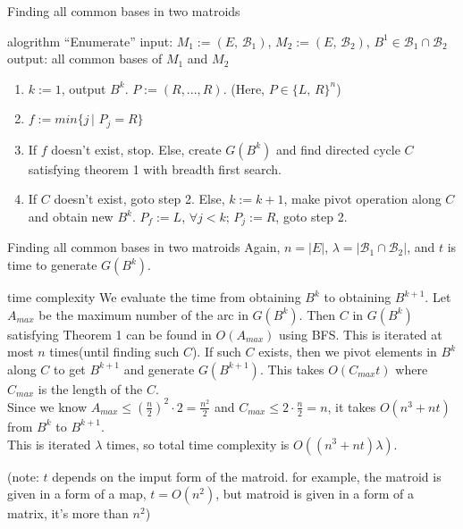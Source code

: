 \documentclass[11pt,xcolor=dvipsnames,table,dvipdfmx]{beamer}
\begin{document}
\begin{frame}{Finding all common bases in two matroids}
 \begin{block}{alogrithm ``Enumerate''}
  input: $M_1 := (E,\,\mathcal{B}_1)$, $M_2 := (E,\,\mathcal{B}_2)$, $B^1 \in \mathcal{B}_1 \cap \mathcal{B}_2$\\
  output: all common bases of $M_1$ and $M_2$\\
  \begin{enumerate}
   \item $k := 1$, output $B^k$. $P := (R, ..., R)$. (Here, $P \in \{L,\,R\}^n$)
   \item $f := min\{j\,|\,\,P_j = R\}$
   \item If $f$ doesn't exist, stop. Else, create $G(B^k)$ and find directed cycle $C$ satisfying theorem 1 with breadth first search.
   \item If $C$ doesn't exist, goto step 2. Else, $k := k + 1$, make pivot operation along $C$ and obtain new $B^k$. $P_f := L$, $\forall j < k;\,P_j := R$, goto step 2.
  \end{enumerate}
 \end{block}
\end{frame}

\begin{frame}{Finding all common bases in two matroids}
 Again, $n = |E|$, $\lambda = |\mathcal{B}_1 \cap \mathcal{B}_2|$, and $t$ is time to generate $G(B^k)$.
 \begin{block}{time complexity}
  We evaluate the time from obtaining $B^k$ to obtaining $B^{k+1}$. Let $A_{max}$ be the maximum number of the arc in $G(B^k)$. Then $C$ in $G(B^k)$ satisfying Theorem 1 can be found in $O(A_{max})$ using BFS. This is iterated at most $n$ times(until finding such $C$). If such $C$ exists, then we pivot elements in $B^k$ along $C$ to get $B^{k+1}$ and generate $G(B^{k+1})$. This takes $O(C_{max}t)$ where $C_{max}$ is the length of the $C$.\\
  Since we know $A_{max} \leq (\frac{n}{2})^2 \cdot 2 = \frac{n^2}{2}$ and $C_{max}\leq 2 \cdot \frac{n}{2} = n$, it takes $O(n^3 + nt)$ from $B^k$ to $B^{k+1}$.\\
This is iterated $\lambda$ times, so total time complexity is $O((n^3 + nt)\lambda)$.
 \end{block}
  (note: $t$ depends on the imput form of the matroid. for example, the matroid is given in a form of a map, $t = O(n^2)$, but matroid is given in a form of a matrix, it's more than $n^2$)
\end{frame}
\end{document}
